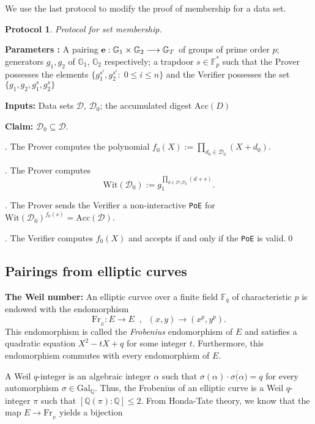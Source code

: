 \documentclass[11pt, lettersize, notitlepage, leqno, footskip=0.6cm]{article}
\newcommand{\bF}{\mathbb F}
\newcommand{\bq}{\mathbb Q}
\newcommand{\bFp}{\mathbb{F}_p}
\newcommand{\absq}{\mathrm{Gal}_{\bq}}
\newcommand{\lra}{\longrightarrow}
\newcommand{\mc}{\mathcal}
\newcommand{\mb}{\mathbb}
\newcommand{\mr}{\mathrm}
\newcommand{\al}{\alpha}
\newcommand{\ov}{\overline}
\newcommand{\sub}{\subseteq}
\newcommand{\vs}{\vspace{-2mm}}
\newcommand{\noin}{\noindent}
\newtheorem{Prot}[Thm]{Protocol}
\numberwithin{equation}{section}
\begin{document}
\noin We use the last protocol to modify the proof of membership for a data set.

\begin{Prot} Protocol for set membership.\end{Prot} \vspace{-0.3cm}

\noindent \textbf{Parameters :} A pairing ${\bf{e}}: \mb{G}_1\times \mb{G}_2\lra \mb{G}_T$ of groups of prime order $p$; generators $g_1, g_2$ of $\mb{G}_1$, $\mb{G}_2$ respectively; a trapdoor $s\in \bFp^*$ such that the Prover possesses the elements $\{g_1^{s^i}, g_2^{s^i}:\; 0\leq i\leq n \}$ and the Verifier possesses the set $\{g_1, g_2, g_1^s, g_2^s \}$ 

\noindent \textbf{Inputs:} Data sets $\mc{D}$, $\mc{D}_0$; the accumulated digest $\mr{Acc}(D)$

\noindent \textbf{Claim:} $\mc{D}_0\sub \mc{D}$.\vspace{0.1cm}

\normalfont \noin 1. The Prover computes the polynomial $f_0(X):= \prod\limits_{d_0\in \mc{D}_0}(X+d_0)$.

. The Prover computes $$\mr{Wit}(\mc{D}_0) := g_1^{\prod\limits_{d\in \mc{D}\setminus \mc{D}_0} (d+s)}.$$

. The Prover sends the Verifier a non-interactive \verb|PoE| for $\mr{Wit}(\mc{D}_0)^{f_0(s)} = \mr{Acc}(\mc{D})$.

. The Verifier computes $f_0(X)$ and accepts if and only if the \verb|PoE| is valid.\qed \\


\subsection{\fontsize{11}{11}\selectfont Pairings from elliptic curves}



\noin \textbf{The Weil number:} An elliptic curvce over a finite field $\bF _q$ of characteristic $p$ is endowed with the endomorphism \vs $$\mr{Fr}_{_E} : E\lra E\;\;,\;\;(x,y)\lra (x^p, y^p) .$$ This endomorphism is called the \textit{Frobenius} endomorphism of $E$ and satisfies a quadratic equation $X^2 - tX + q$ for some integer $t$. Furthermore, this endomorphism commutes with every endomorphism of $E$.

A Weil $q$-integer is an algebraic integer $\al$ such that $\sigma(\al)\cdot \ov{\sigma(\al}) = q$ for every automorphism $\sigma\in \absq$. Thus, the Frobenius of an elliptic curve is a Weil $q$-integer $\pi$ such that $[\bq(\pi):\bq]\leq 2$. From Honda-Tate theory, we know that the map $E\lra \mr{Fr}_{_E}$ yields a bijection \vspace{-5mm}
\end{document}
